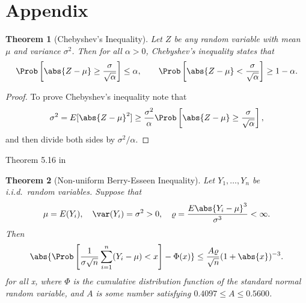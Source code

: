 \documentclass[12pt]{amsart}
\newtheorem{theorem}{Theorem}
\begin{document}
\section*{Appendix}
\begin{theorem}[Chebyshev's Inequality] \label{Chebineqthm} Let $Z$ be any random variable with mean $\mu$ and variance $\sigma^2$.  Then for all $\alpha >0$, Chebyshev's inequality states that
\[
\Prob\left[\abs{Z-\mu} \ge \frac{\sigma}{\sqrt{\alpha}} \right] \le \alpha, \qquad \Prob\left[\abs{Z-\mu} < \frac{\sigma}{\sqrt{\alpha}} \right] \ge 1-\alpha.
\]
\end{theorem}
\begin{proof}To prove Chebyshev's inequality note that
\begin{equation*}
\sigma^2 = E[\abs{Z-\mu}^2] \ge \frac{\sigma^2}{\alpha} \Prob\left[\abs{Z-\mu} \ge \frac{\sigma}{\sqrt{\alpha}} \right],
\end{equation*}
and then divide both sides by $\sigma^2/\alpha$.
\end{proof}
Theorem 5.16 in \cite{p1}
\begin{theorem}[Non-uniform Berry-Esseen Inequality] \label{BE} Let $Y_1,\dots,Y_n$ be i.i.d.\ random variables.  Suppose that
\[
\mu=E(Y_i), \quad \var(Y_i)=\sigma^2>0, \quad \varrho=\frac{E\abs{Y_i - \mu}^3}{\sigma^3} < \infty.
\]
Then
\[
\abs{\Prob\left[\frac{1}{\sigma\sqrt{n}}\sum_{i=1}^{n}(Y_i-\mu)<x
\right]-\Phi(x)}\leq \frac{A \varrho}{\sqrt{n}}(1+\abs{x})^{-3}.
\] for all x,
where $\Phi$ is the cumulative distribution function of the standard normal random variable, and $A$ is some number satisfying $0.4097\leq A\leq 0.5600$.
\end{theorem}
\end{document}
